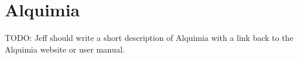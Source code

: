 \section{Alquimia}

{\color{red}TODO: Jeff should write a short description of Alquimia with a
link back to the Alquimia website or user manual.}
